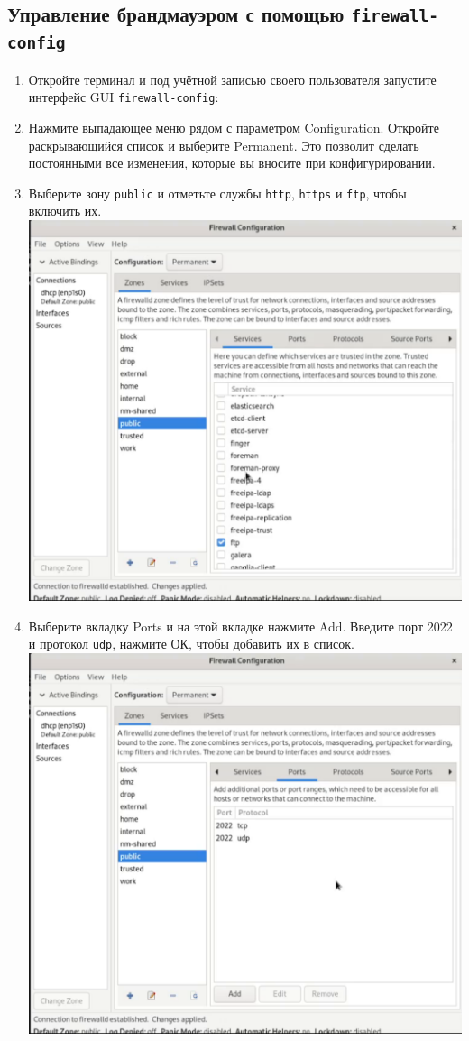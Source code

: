 \documentclass[12pt]{article}
\begin{document}
\subsection{Управление брандмауэром с помощью \texttt{firewall-config}}
\begin{enumerate}
	\item Откройте терминал и под учётной записью своего пользователя запустите интерфейс GUI \texttt{firewall-config}:
	\item Нажмите выпадающее меню рядом с параметром Configuration. Откройте раскрывающийся список и выберите Permanent. Это позволит сделать постоянными все изменения, которые вы вносите при конфигурировании.
	\item Выберите зону \texttt{public} и отметьте службы \texttt{http}, \texttt{https} и \texttt{ftp}, чтобы включить их.
	      \\\includegraphics{12.png}
	\item Выберите вкладку Ports и на этой вкладке нажмите Add. Введите порт 2022 и протокол \texttt{udp}, нажмите ОК, чтобы добавить их в список.
	      \\\includegraphics{13.png}

\end{enumerate}
\end{document}
